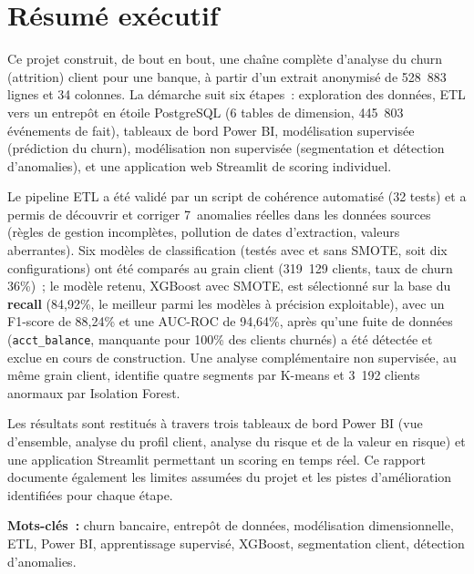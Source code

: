 \documentclass[11pt,a4paper]{report}
\begin{document}
\chapter*{R\'esum\'e ex\'ecutif}

Ce projet construit, de bout en bout, une cha\^ine compl\`ete d'analyse du churn
(attrition) client pour une banque, \`a partir d'un extrait anonymis\'e de
528~883 lignes et 34 colonnes. La d\'emarche suit six \'etapes~: exploration des
donn\'ees, ETL vers un entrep\^ot en \'etoile PostgreSQL (6 tables de dimension,
445~803 \'ev\'enements de fait), tableaux de bord Power BI, mod\'elisation
supervis\'ee (pr\'ediction du churn), mod\'elisation non supervis\'ee (segmentation
et d\'etection d'anomalies), et une application web Streamlit de scoring
individuel.

Le pipeline ETL a \'et\'e valid\'e par un script de coh\'erence automatis\'e (32
tests) et a permis de d\'ecouvrir et corriger 7~anomalies r\'eelles dans les
donn\'ees sources (r\`egles de gestion incompl\`etes, pollution de dates
d'extraction, valeurs aberrantes). Six mod\`eles de classification (test\'es
avec et sans SMOTE, soit dix configurations) ont \'et\'e compar\'es au grain
client (319~129 clients, taux de churn 36\%)~; le mod\`ele retenu, XGBoost avec
SMOTE, est s\'electionn\'e sur la base du \textbf{recall} (84,92\%, le meilleur
parmi les mod\`eles \`a pr\'ecision exploitable), avec un F1-score de 88,24\% et
une AUC-ROC de 94,64\%, apr\`es qu'une fuite de donn\'ees
(\texttt{acct\_balance}, manquante pour 100\% des clients churn\'es) a \'et\'e
d\'etect\'ee et exclue en cours de construction. Une analyse compl\'ementaire non
supervis\'ee, au m\^eme grain client, identifie quatre segments par K-means et
3~192 clients anormaux par Isolation Forest.

Les r\'esultats sont restitu\'es \`a travers trois tableaux de bord Power BI
(vue d'ensemble, analyse du profil client, analyse du risque et de la valeur
en risque) et une application Streamlit permettant un scoring en temps r\'eel.
Ce rapport documente \'egalement les limites assum\'ees du projet et les pistes
d'am\'elioration identifi\'ees pour chaque \'etape.

\textbf{Mots-cl\'es~:} churn bancaire, entrep\^ot de donn\'ees, mod\'elisation
dimensionnelle, ETL, Power BI, apprentissage supervis\'e, XGBoost, segmentation
client, d\'etection d'anomalies.
\end{document}
